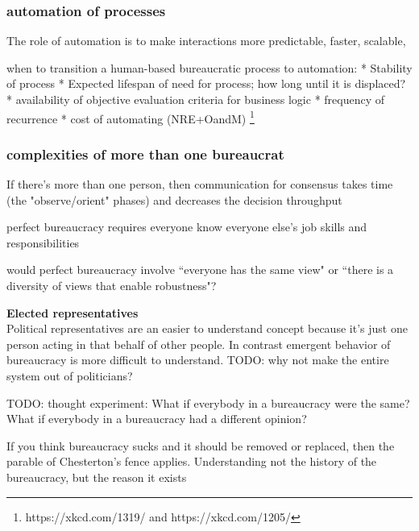 \subsubsection{automation of processes}

The role of automation is to make interactions more predictable, faster, scalable,

when to transition a human-based bureaucratic process to automation:
* Stability of process
* Expected lifespan of need for process; how long until it is displaced?
* availability of objective evaluation criteria for business logic
* frequency of recurrence
* cost of automating (NRE+OandM)
\footnote{https://xkcd.com/1319/ and https://xkcd.com/1205/}


\subsubsection{complexities of more than one bureaucrat}


If there's more than one person, then communication for consensus takes time (the "observe/orient" phases) and decreases the decision throughput

perfect bureaucracy requires everyone know everyone else's job skills and responsibilities

would perfect bureaucracy involve ``everyone has the same view" or ``there is a diversity of views that enable robustness"?



\textbf{Elected representatives}\\
Political representatives are an easier to understand concept because it's just one person acting in that behalf of other people.
In contrast emergent behavior of bureaucracy is more difficult to understand. 
TODO: why not make the entire system out of politicians?


TODO: thought experiment: 
What if everybody in a bureaucracy were the same?
What if everybody in a bureaucracy had a different opinion?


If you think bureaucracy sucks and it should be removed or replaced, then the parable of Chesterton's fence applies. Understanding not the history of the bureaucracy, but the reason it exists

